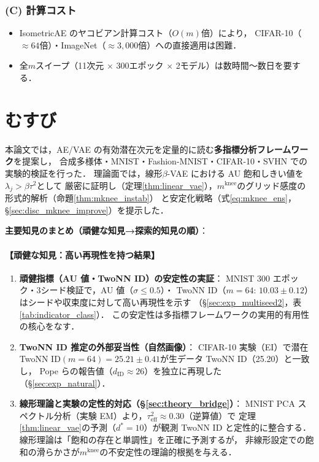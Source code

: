 \documentclass[11pt,a4paper]{jsarticle}
\newcommand{\mknee}{m^{\mathrm{knee}}}
\begin{document}
\subsubsection*{(C) 計算コスト}

\begin{itemize}
  \item IsometricAE のヤコビアン計算コスト（$O(m)$倍）により，
        CIFAR-10（$\approx 64$倍）・ImageNet（$\approx 3{,}000$倍）への直接適用は困難．
  \item 全$m$スイープ（11次元 $\times$ 300エポック $\times$ 2モデル）は数時間〜数日を要する．
\end{itemize}

\section{むすび}\label{sec:conclusion}

本論文では，AE/VAE の有効潜在次元を定量的に読む\textbf{多指標分析フレームワーク}を提案し，
合成多様体・MNIST・Fashion-MNIST・CIFAR-10・SVHN での実験的検証を行った．
理論面では，線形$\beta$-VAE における AU 飽和しきい値を$\lambda_j > \beta\tau^2$として
厳密に証明し（定理\ref{thm:linear_vae}），$\mknee$のグリッド感度の形式的解析（命題\ref{thm:mknee_instab}）
と安定化戦略（式\eqref{eq:mknee_ens}，§\ref{sec:disc_mknee_improve}）を提示した．

\textbf{主要知見のまとめ（頑健な知見→探索的知見の順）}：

\paragraph{【頑健な知見：高い再現性を持つ結果】}
\begin{enumerate}
  \item \textbf{頑健指標（AU 値・TwoNN ID）の安定性の実証}：
        MNIST 300 エポック・3シード検証で，AU 値（$\sigma \leq 0.5$）・
        TwoNN ID（$m=64$: $10.03 \pm 0.12$）はシードや収束度に対して高い再現性を示す
        （§\ref{sec:exp_multiseed2}，表\ref{tab:indicator_class}）．
        この安定性は多指標フレームワークの実用的有用性の核心をなす．
  \item \textbf{TwoNN ID 推定の外部妥当性（自然画像）}：
        CIFAR-10 実験（EI）で潜在 TwoNN ID$(m=64)=25.21\pm0.41$が生データ TwoNN ID（25.20）と一致し，
        Pope ら\cite{pope2021intrinsic}の報告値（$d_\mathrm{ID} \approx 26$）を独立に再現した
        （§\ref{sec:exp_natural}）．
  \item \textbf{線形理論と実験の定性的対応（§\ref{sec:theory_bridge}）}：
        MNIST PCA スペクトル分析（実験 EM）より，$\tau^2_\mathrm{eff} \approx 0.30$（逆算値）で
        定理\ref{thm:linear_vae}の予測（$d^*=10$）が観測 TwoNN ID と定性的に整合する．
        線形理論は「飽和の存在と単調性」を正確に予測するが，
        非線形設定での飽和の滑らかさが$\mknee$の不安定性の理論的根拠を与える．
\end{enumerate}
\end{document}
